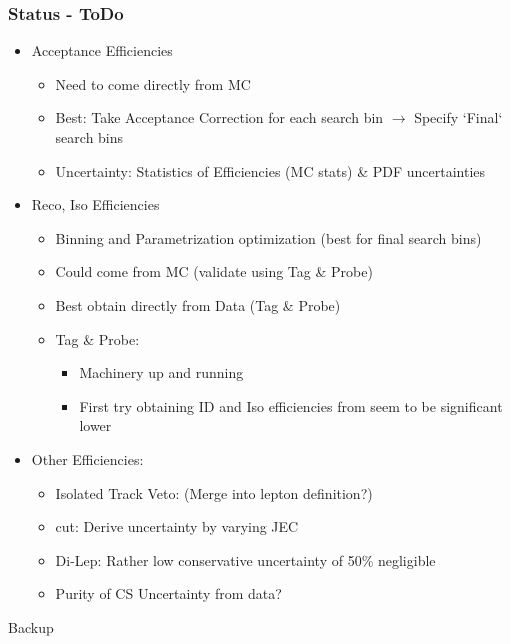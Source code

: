 \documentclass{beamer}
\begin{document}
\begin{frame}
 \frametitle{Status - ToDo}
 \begin{itemize}
  \item Acceptance Efficiencies
  \begin{itemize}
   \item Need to come directly from MC
   \item Best: Take Acceptance Correction for each search bin $\rightarrow$ Specify `Final` search bins
   \item Uncertainty: Statistics of Efficiencies (MC stats) \& PDF uncertainties
  \end{itemize}
  \item Reco, Iso Efficiencies
  \begin{itemize}
   \item Binning and Parametrization optimization (best for final search bins)
   \item Could come from MC (validate using Tag \& Probe)
   \item Best obtain directly from Data (Tag \& Probe)

  \item Tag \& Probe:
 \begin{itemize}
  \item Machinery up and running
  \item First try obtaining ID and Iso efficiencies from \Zll seem to be significant lower
 \end{itemize}
 \end{itemize}
 \item Other Efficiencies:
 \begin{itemize}
  \item Isolated Track Veto: (Merge into lepton definition?)
  \item \mt cut: Derive uncertainty by varying JEC
  \item Di-Lep: Rather low conservative uncertainty of 50\% negligible
  \item Purity of CS Uncertainty from data?
 \end{itemize}

 \end{itemize}

\end{frame}

\begin{frame}
 \begin{block}{}
 \centering
 \Large Backup
 \end{block}
\end{frame}
\end{document}
